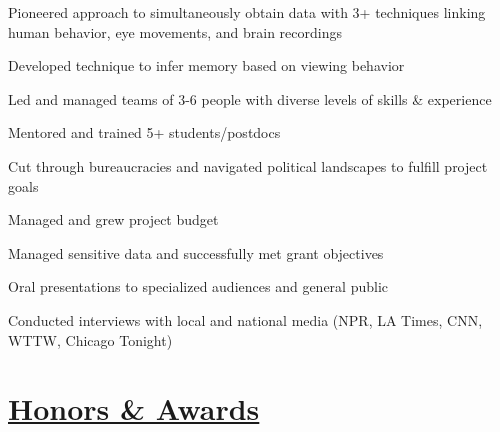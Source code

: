 \documentclass[]{winter-resume-openfont}
\begin{document}
\begin{minipage}[t]{0.65\textwidth}
\begin{tightemize}
\item Pioneered approach to simultaneously obtain data with 3+ techniques linking human behavior, eye movements, and brain recordings
\item Developed technique to infer memory based on viewing behavior
\end{tightemize}


\begin{tightemize}
\item Led and managed teams of 3-6 people with diverse levels of skills \& experience
\item Mentored and trained 5+ students/postdocs
\end{tightemize}


\begin{tightemize}
\item Cut through bureaucracies and navigated political landscapes to fulfill project goals
\item Managed and grew project budget 
\item Managed sensitive data and successfully met grant objectives
\end{tightemize}

\begin{tightemize}
\item Oral presentations to specialized audiences and general public
\item Conducted interviews with local and national media (NPR, LA Times, CNN, WTTW, Chicago Tonight)
\end{tightemize}

\sectionsep





\sectionsep
\sectionsep
\section{\underline{Honors \& Awards}}
\sectionsep


\end{minipage}
\end{document}
